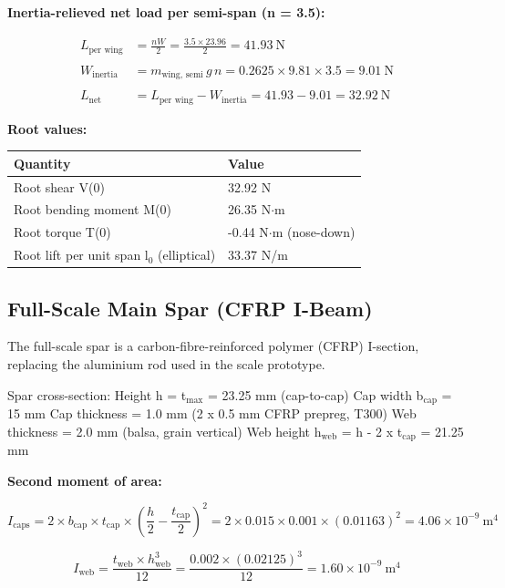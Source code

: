 \documentclass[10pt,a4paper]{article}
\begin{document}
\textbf{Inertia-relieved net load per semi-span (n = 3.5):}

\begin{align}
L_{\text{per wing}} &= \frac{n W}{2} 
= \frac{3.5 \times 23.96}{2} 
= 41.93\ \text{N} \\
\\
W_{\text{inertia}} &= m_{\text{wing, semi}} \, g \, n 
= 0.2625 \times 9.81 \times 3.5 
= 9.01\ \text{N} \\
\\
L_{\text{net}} &= L_{\text{per wing}} - W_{\text{inertia}} 
= 41.93 - 9.01 
= 32.92\ \text{N}
\end{align}

\textbf{Root values:}

\begin{center}
\begin{tabular}{|l|l|}
\hline
Quantity & Value \\
\hline
Root shear V(0) & 32.92 N \\
\hline
Root bending moment M(0) & 26.35 N${\cdot}$m \\
\hline
Root torque T(0) & -0.44 N${\cdot}$m (nose-down) \\
\hline
Root lift per unit span l$_{0}$ (elliptical) & 33.37 N/m \\
\hline
\end{tabular}
\end{center}


\subsection{Full-Scale Main Spar (CFRP I-Beam)}


The full-scale spar is a carbon-fibre-reinforced polymer (CFRP) I-section, replacing the aluminium rod used in the scale prototype.

Spar cross-section:
  Height h         = t\(_\text{max}\) = 23.25 mm  (cap-to-cap)
  Cap width b\(_\text{cap}\)  = 15 mm
  Cap thickness    = 1.0 mm (2 x 0.5 mm CFRP prepreg, T300)
  Web thickness    = 2.0 mm (balsa, grain vertical)
  Web height h\(_\text{web}\) = h - 2 x t\(_\text{cap}\) = 21.25 mm

\textbf{Second moment of area:}

\[
I_{\text{caps}} = 2 \times b_{\text{cap}} \times t_{\text{cap}} \times \left(\frac{h}{2} - \frac{t_{\text{cap}}}{2}\right)^2 = 2 \times 0.015 \times 0.001 \times (0.01163)^2 = 4.06 \times 10^{-9}\ \text{m}^4
\]

\[
I_{\text{web}} = \frac{t_{\text{web}} \times h_{\text{web}}^3}{12} = \frac{0.002 \times (0.02125)^3}{12} = 1.60 \times 10^{-9}\ \text{m}^4
\]
\end{document}
